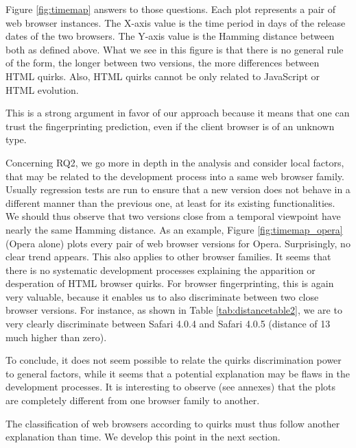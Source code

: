 \documentclass[10pt]{IEEEtran}
\begin{document}
Figure \ref{fig:timemap} answers to those questions.
Each plot represents a pair of web browser
instances. The X-axis value is the time period in days of the release dates of the two browsers.
The Y-axis value is the Hamming distance between both as defined above. 
What we see in this figure is that there is no general rule of the form, the longer between two versions, 
the more differences between HTML quirks.
Also, HTML quirks cannot be only related to JavaScript or HTML evolution.




This is a strong argument in favor of our approach because it means that one can trust the fingerprinting prediction, 
even if the client browser is of an unknown type.




Concerning RQ2, we go more in depth in the analysis and consider local
factors, that may be related to the development process into a same
web browser family. Usually regression tests are run to ensure that a
new version does not behave in a different manner than the previous
one, at least for its existing functionalities. We should thus observe
that two versions close from a temporal viewpoint have nearly the same
Hamming distance. As an example, Figure \ref{fig:timemap_opera} (Opera alone) plots every
pair of web browser versions for Opera. Surprisingly, no clear trend
appears. 
This also applies to other browser families.
It seems that there is no systematic development processes explaining
the apparition or desperation of HTML browser quirks.
For browser fingerprinting, this is again very valuable, because it enables us 
to also discriminate between two close browser versions.
For instance, as shown in Table \ref{tab:distancetable2}, we are to very clearly discriminate between  
Safari 4.0.4 and Safari 4.0.5 (distance of 13 much higher than zero).




To conclude, it does not seem possible  to relate the quirks
discrimination power to general factors, while it seems that a
potential explanation may be flaws in the development processes. It is
interesting to observe (see annexes) that the plots are completely
different from one browser family to another. 




The classification of web browsers according to quirks must thus
follow another explanation than time. We develop this point in the next section.
\end{document}
